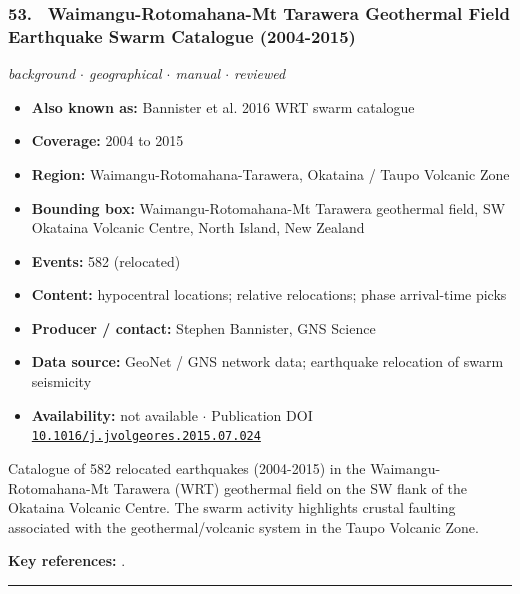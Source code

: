\documentclass[10pt,a4paper]{article}
\newcommand{\catentryrule}{\par\vspace{3pt}\noindent\textcolor{rulegrey}{\rule{\linewidth}{0.3pt}}\par\vspace{5pt}}
\newcommand{\kv}[2]{\item \textbf{#1:} #2}
\begin{document}
\subsubsection*{\hypertarget{c:53}{53.}~ Waimangu-Rotomahana-Mt Tarawera Geothermal Field Earthquake Swarm Catalogue (2004-2015)}
{\small\itshape background $\cdot$ geographical $\cdot$ manual $\cdot$ reviewed}\par\vspace{2pt}
\begin{itemize}[leftmargin=1.3em,itemsep=0.6pt,topsep=1pt,parsep=0pt]
\kv{Also known as}{Bannister et al. 2016 WRT swarm catalogue}
\kv{Coverage}{2004 to 2015}
\kv{Region}{Waimangu-Rotomahana-Tarawera, Okataina / Taupo Volcanic Zone}
\kv{Bounding box}{Waimangu-Rotomahana-Mt Tarawera geothermal field, SW Okataina Volcanic Centre, North Island, New Zealand}
\kv{Events}{582 (relocated)}
\kv{Content}{hypocentral locations; relative relocations; phase arrival-time picks}
\kv{Producer / contact}{Stephen Bannister, GNS Science}
\kv{Data source}{GeoNet / GNS network data; earthquake relocation of swarm seismicity}
\kv{Availability}{not available $\cdot$ Publication DOI \href{https://doi.org/10.1016/j.jvolgeores.2015.07.024}{\nolinkurl{10.1016/j.jvolgeores.2015.07.024}}}
\end{itemize}
\par\vspace{2pt}Catalogue of 582 relocated earthquakes (2004-2015) in the Waimangu-Rotomahana-Mt Tarawera (WRT) geothermal field on the SW flank of the Okataina Volcanic Centre. The swarm activity highlights crustal faulting associated with the geothermal/volcanic system in the Taupo Volcanic Zone.
\par\vspace{2pt}\textbf{Key references:} \cite{Bannister2016}.
\catentryrule
\end{document}
